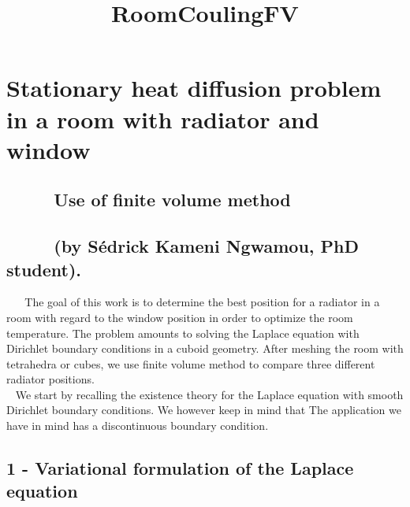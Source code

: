 \documentclass[11pt]{article}
\title{RoomCoulingFV}
\begin{document}
    
    
    \maketitle
    
    

    
    \hypertarget{stationary-heat-diffusion-problem-in-a-room-with-radiator-and-window}{%
\section{Stationary heat diffusion problem in a room with radiator and
window}\label{stationary-heat-diffusion-problem-in-a-room-with-radiator-and-window}}

\hypertarget{use-of-finite-volume-method}{%
\subsection{~ ~ ~ Use of finite volume
method}\label{use-of-finite-volume-method}}

\hypertarget{by-suxe9drick-kameni-ngwamou-phd-student.}{%
\subsection{~ ~ ~ (by Sédrick Kameni Ngwamou, PhD
student).}\label{by-suxe9drick-kameni-ngwamou-phd-student.}}

~ ~ The goal of this work is to determine the best position for a
radiator in a room with regard to the window position in order to
optimize the room temperature. The problem amounts to solving the
Laplace equation with Dirichlet boundary conditions in a cuboid
geometry. After meshing the room with tetrahedra or cubes, we use finite
volume method to compare three different radiator positions.\\
\hspace*{0.333em} ~ We start by recalling the existence theory for the
Laplace equation with smooth Dirichlet boundary conditions. We however
keep in mind that The application we have in mind has a discontinuous
boundary condition.

\hypertarget{variational-formulation-of-the-laplace-equation}{%
\subsection{1 - Variational formulation of the Laplace
equation}\label{variational-formulation-of-the-laplace-equation}}
\end{document}
